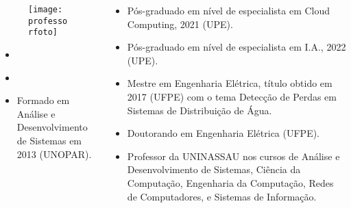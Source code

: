 \begin{frame}[t]

    \begin{columns}[onlytextwidth,T]

        \begin{column}[T]{0.49\linewidth}
            \begin{figure}[htb]
              \centering{}
              \texttt{[image: \\professorfoto]}

              \textbf{\href{\professorlattes}{\professor}}
            \end{figure}

            \begin{itemize}
              \justifying{}
              \setlength\itemsep{1em}
              \item \href{\professorsite}{\professorsite}
              \item \href{\professorlattes}{\professorlattes}
              \item Formado em Análise e Desenvolvimento de Sistemas em 2013 (UNOPAR).
            \end{itemize}
        \end{column}

        \begin{column}{0.5\linewidth}
            \small
            \begin{itemize}\small
                \justifying{}
                \item Pós-graduado em nível de especialista em Cloud Computing, 2021 (UPE).
                \item Pós-graduado em nível de especialista em I.A., 2022 (UPE).
                \item Mestre em Engenharia Elétrica, título obtido em 2017 (UFPE) com o tema Detecção de Perdas em Sistemas de Distribuição de Água.
                \item Doutorando em Engenharia Elétrica (UFPE).
                \item Professor da UNINASSAU nos cursos de Análise e Desenvolvimento de Sistemas, Ciência da Computação, Engenharia da Computação, Redes de Computadores, e Sistemas de Informação.
            \end{itemize}
        \end{column}

    \end{columns}

\end{frame}
